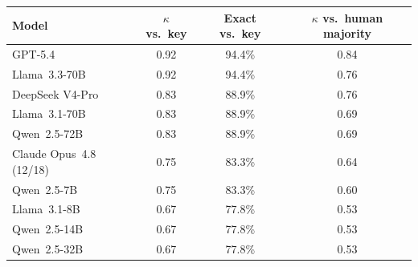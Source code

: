 \begin{tabular}{lccc}
\toprule
Model & $\kappa$ vs.\ key & Exact vs.\ key & $\kappa$ vs.\ human majority \\
\midrule
GPT-5.4 & 0.92 & 94.4\% & 0.84 \\
Llama~3.3-70B & 0.92 & 94.4\% & 0.76 \\
DeepSeek V4-Pro & 0.83 & 88.9\% & 0.76 \\
Llama~3.1-70B & 0.83 & 88.9\% & 0.69 \\
Qwen~2.5-72B & 0.83 & 88.9\% & 0.69 \\
Claude Opus~4.8 (12/18) & 0.75 & 83.3\% & 0.64 \\
Qwen~2.5-7B & 0.75 & 83.3\% & 0.60 \\
Llama~3.1-8B & 0.67 & 77.8\% & 0.53 \\
Qwen~2.5-14B & 0.67 & 77.8\% & 0.53 \\
Qwen~2.5-32B & 0.67 & 77.8\% & 0.53 \\
\bottomrule
\end{tabular}
